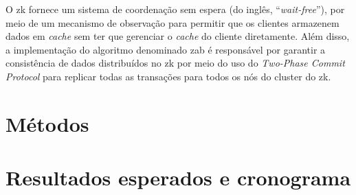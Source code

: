 O \gls{zk} fornece um sistema de coordenação sem espera (do inglês, ``\textit{wait-free}''), por meio de um mecanismo de observação para permitir que os clientes armazenem dados em \textit{cache} sem ter que gerenciar o \textit{cache} do cliente diretamente. Além disso, a implementação do algoritmo denominado \gls{zab} é responsável por garantir a consistência de dados distribuídos no \gls{zk} por meio do uso do \textit{Two-Phase Commit Protocol} para replicar todas as transações para todos os nós do cluster do \gls{zk}\cite{CloudKarafkaZAB}.

\section{Métodos}\label{sec:metodo}

\section{Resultados esperados e cronograma}

